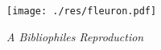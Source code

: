 \begin{titlepage}
    \begin{center}
        \large

        \hfill

        \vfill

        \begingroup
            \color{Maroon} \\ \bigskip
        \endgroup

         \\
        
        \vfill
        
        \texttt{[image: ./res/fleuron.pdf]}
        
        \vfill


        \textit{A Bibliophiles Reproduction} \\ \medskip

        \myTime
        

        \vfill                      

    \end{center}  
\end{titlepage}   
